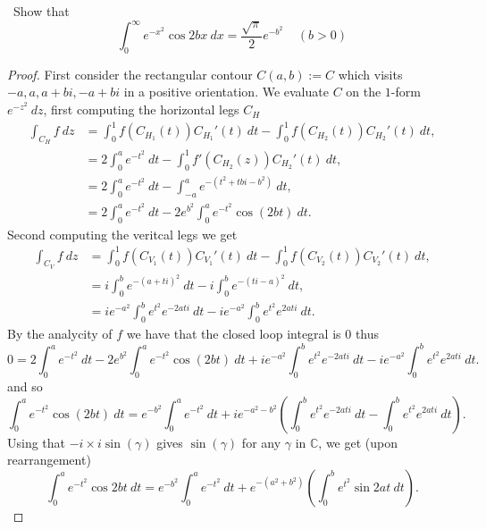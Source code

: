 \documentclass[11pt]{amsart}
\theoremstyle{definition}
\numberwithin{theorem}{section}
\numberwithin{definition}{section}
\numberwithin{equation}{section}
\begin{document}
\medskip {}\ Show that
\begin{equation*}
	\int_0^\infty e^{-x^2}\cos 2bx\ dx = \frac{\sqrt{\pi}}{2}e^{-b^2}\;\;\;\;(b>0)
\end{equation*}
\begin{proof}
	First consider the rectangular contour $C(a,b) := C$ which visits $-a, a, a+bi, -a+bi$ in a positive orientation. We
	evaluate $C$ on the $1$-form $e^{-z^2}\ dz$, first computing the horizontal legs $C_H$
	\begin{equation*}
		\begin{aligned}
		\int_{C_H} f\ dz&= \int_{0}^1 f(C_{H_1}(t)) C_{H_1}'(t) \ dt -  \int_{0}^1 f(C_{H_2}(t)) C_{H_2}'(t)\ dt,\\
		&= 2\int_{0}^a e^{-t^2}\ dt  -  \int_{0}^1 f'(C_{H_2}(z)) C_{H_2}'(t)\ dt,\\
		&= 2\int_{0}^a e^{-t^2}\ dt - \int_{-a}^a e^{-(t^2  +tbi -b^2)}\ dt,\\
		&= 2\int_{0}^a e^{-t^2}\ dt - 2e^{b^2}\int_{0}^a e^{-t^2}\cos(2bt)\ dt.
		\end{aligned}
	\end{equation*}
	Second computing the veritcal legs we get
	\begin{equation*}
		\begin{aligned}
			\int_{C_V} f\ dz &= \int_{0}^1 f(C_{V_1}(t)) C_{V_1}'(t) \ dt -  \int_{0}^1 f(C_{V_2}(t)) C_{V_2}'(t)\ dt,\\
			&= i\int_0^b e^{-(a+ti)^2}\ dt - i\int_0^b e^{-(ti-a)^2}\ dt, \\
			&=  ie^{-a^2}\int_0^b e^{t^2}e^{-2ati}\ dt - ie^{-a^2}\int_0^b e^{t^2}e^{2ati}\ dt.
		\end{aligned}
	\end{equation*}
	By the analycity of $f$ we have that the closed loop integral is $0$ thus
	\begin{equation*}
			0 = 2\int_{0}^a e^{-t^2}\ dt - 2e^{b^2}\int_{0}^a e^{-t^2}\cos(2bt)\ dt + ie^{-a^2}\int_0^b e^{t^2}e^{-2ati}\ dt - ie^{-a^2}\int_0^b e^{t^2}e^{2ati}\ dt.
	\end{equation*}
	and so \begin{equation*}
		\int_{0}^a e^{-t^2}\cos(2bt)\ dt = e^{-b^2}\int_{0}^a e^{-t^2}\ dt + i e^{-a^2 -b^2} \left(\int_0^b e^{t^2}e^{-2ati}\ dt - \int_0^b e^{t^2}e^{2ati}\ dt \right).
	\end{equation*}
	Using that $-i\times i \sin(\gamma)$ gives $\sin(\gamma)$ for any $\gamma$ in $\mathbb{C}$, we get (upon rearrangement)
	\begin{equation*}
	\int_{0}^a e^{-t^2}\cos{2bt}\ dt = e^{-b^2}\int_{0}^a e^{-t^2}\ dt + e^{-(a^2 +b^2)} \left(\int_0^b e^{t^2}\sin{2at}\ dt \right).
	\end{equation*}


\end{proof}
\end{document}

